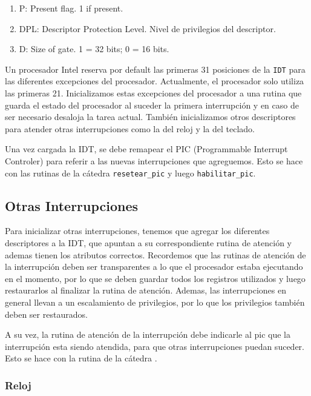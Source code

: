 \begin{enumerate}
\item P: Present flag. 1 if present.
\item DPL: Descriptor Protection Level. Nivel de privilegios del descriptor.
\item D: Size of gate. 1 = 32 bits; 0 = 16 bits.
\end{enumerate}

Un procesador Intel reserva por default las primeras 31 posiciones de la \texttt{IDT} para las diferentes excepciones del procesador. Actualmente, el procesador solo utiliza las primeras 21. Inicializamos estas excepciones del procesador a una rutina que guarda el estado del procesador al suceder la primera interrupción y en caso de ser necesario desaloja la tarea actual. También inicializamos otros descriptores para atender otras interrupciones como la del reloj y la del teclado.

Una vez cargada la IDT, se debe remapear el PIC (Programmable Interrupt Controler) para referir a las nuevas interrupciones que agreguemos. Esto se hace con las rutinas de la cátedra \texttt{resetear\_pic} y luego \texttt{habilitar\_pic}.

\pagebreak

\subsection{Otras Interrupciones}

Para inicializar otras interrupciones, tenemos que agregar los diferentes descriptores a la IDT, que apuntan a su correspondiente rutina de atención y ademas tienen los atributos correctos. Recordemos que las rutinas de atención de la interrupción deben ser transparentes a lo que el procesador estaba ejecutando en el momento, por lo que se deben guardar todos los registros utilizados y luego restaurarlos al finalizar la rutina de atención. Ademas, las interrupciones en general llevan a un escalamiento de privilegios, por lo que los privilegios también deben ser restaurados.

A su vez, la rutina de atención de la interrupción debe indicarle al pic que la interrupción esta siendo atendida, para que otras interrupciones puedan suceder. Esto se hace con la rutina de la cátedra .

\subsubsection{Reloj}

